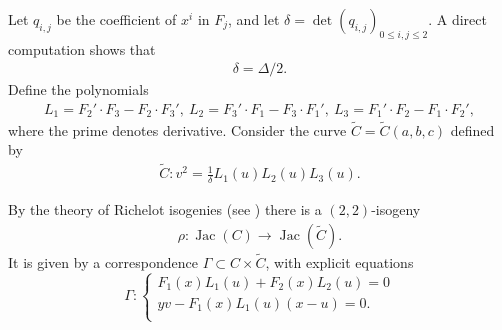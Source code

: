 \documentclass[oneside]{amsart}
\theoremstyle{remark}
\newcommand{\ra}{\rightarrow}
\newcommand{\Qbar}{{\overline{\mathbb Q}}}
\newcommand{\Z}{\mathbb Z}
\newcommand{\GL}{\mathrm{GL}}
\newcommand{\End}{\operatorname{End}}
\newcommand{\Jac}{\operatorname{Jac}}
\numberwithin{equation}{section}
\begin{document}

Let $q_{i,j}$ be the coefficient of $x^i$ in $F_j$, and let $\delta = \det \left(q_{i,j} \right)_{0\leq i,j\leq 2}$. A direct computation shows that
\begin{align}
  \label{eq:delta}
 \delta = \Delta/2. 
\end{align}
Define the polynomials
\begin{align*}
  L_1 = F_2'\cdot F_3 - F_2 \cdot F_3', \   L_2 = F_3'\cdot F_1 - F_3 \cdot F_1', \  L_3 = F_1'\cdot F_2 - F_1 \cdot F_2',
\end{align*}
where the prime denotes derivative. Consider the curve $\tilde{C}=\tilde{C}(a,b,c)$ defined by
\begin{align*}
  \tilde C \colon v^2 = \frac{1}{\delta}L_1(u)L_2(u)L_3(u).
\end{align*}

By the theory of Richelot isogenies (see \cite[Chapter 9]{CF96}) there is a $(2,2)$-isogeny  
\begin{align}
  \label{eq:richelot}
 \rho\colon \Jac(C)\ra \Jac(\tilde{C}). 
\end{align}
It is given by a correspondence $\Gamma\subset C\times \tilde C$, with explicit equations
\begin{equation*}\label{eq:gamma-correspondence}
    \Gamma:\begin{cases}
    F_1(x)L_1(u) + F_2(x)L_2(u) = 0\\
    y v - F_1(x)L_1(u) (x-u)=0.\\
    \end{cases}
\end{equation*}
\end{document}
